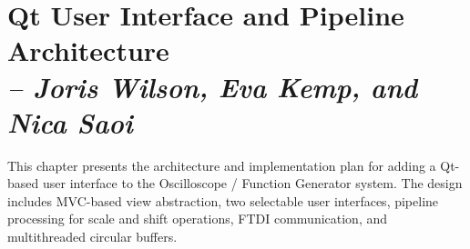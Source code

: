 \chapter{Qt User Interface and Pipeline Architecture\\
\small\textit{-- Joris Wilson, Eva Kemp, and Nica Saoi}}
\label{Chapter::Qt User Interface and Pipeline Architecture}

This chapter presents the architecture and implementation plan for adding a Qt-based user interface to the Oscilloscope / Function Generator system. The design includes MVC-based view abstraction, two selectable user interfaces, pipeline processing for scale and shift operations, FTDI communication, and multithreaded circular buffers.

